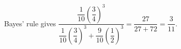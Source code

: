 Bayes' rule gives $\dfrac{\dfrac{1}{10}(\dfrac{3}{4})^3}{\dfrac{1}{10}(\dfrac{3}{4})^3+\dfrac{9}{10}(\dfrac{1}{2})^3}=\dfrac{27}{27+72}=\boxed{\dfrac{3}{11}}$.
